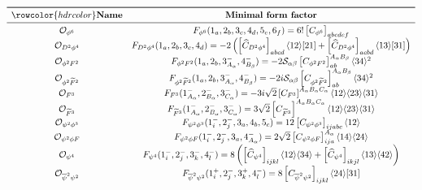 \begin{table}[tbp]
\renewcommand{\arraystretch}{2.3}
\begin{align*}
\begin{array}[t]{cc}
\toprule
\rowcolor{hdrcolor}
\text{\textbf{Name}}  & \text{\textbf{Minimal form factor}} \\
\midrule
\mathcal O_{\phi^6} & F_{\phi^6}(1_{a},2_{b},3_{c},4_{d},5_{e},6_{f}) = 6! \left[C_{\phi^6}\right]_{abcdef}\\
\mathcal O_{D^2\phi^4}  & F_{D^2\phi^4}(1_a,2_b,3_c,4_d) =-2\left(\left[\widehat C_{D^2\phi^4}\right]_{abcd} \agl{1}{2}\sqr{2}{1}  + \left[\widehat C_{D^2\phi^4}\right]_{acbd} \agl{1}{3}\sqr{3}{1}\right)\\
\mathcal{O}_{\phi^2 F^2} &
F_{\phi^2 F^2}(1_a,2_b,3^-_{A_\alpha},4^-_{B_\beta}) = -2 \mathcal S_{\alpha\beta} \left[C_{\phi^2 F^2}\right]^{A_\alpha B_\beta}_{a b}\agl{3}{4}^2\\
\mathcal{O}_{\phi^2\tildee F^2} & F_{\phi^2 \tildee F^2}(1_a,2_b,3^-_{A_\alpha},4^-_{B_\beta}) = -2i \mathcal S_{\alpha\beta} \left[C_{\phi^2 \tildee F^2}\right]^{A_\alpha B_\beta}_{a b}\agl{3}{4}^2\\
 \mathcal{O}_{F^3} & F_{F^3}(1^-_{A_\alpha},2^-_{B_\alpha},3^-_{C_\alpha}) =-3i\sqrt{2} \left[C_{F^3}\right]^{A_\alpha B_\alpha C_\alpha} \agl{1}{2}\agl{2}{3}\agl{3}{1}\\
  \mathcal{O}_{\tildee F^3} & F_{\tildee F^3}(1^-_{A_\alpha},2^-_{B_\alpha},3^-_{C_\alpha}) =3\sqrt{2} \left[C_{\tildee F^3}\right]^{A_\alpha B_\alpha C_\alpha} \agl{1}{2}\agl{2}{3}\agl{3}{1}\\
\mathcal O_{\psi^2\phi^3} & F_{\psi^2 \phi^3}(1^-_i,2^-_j,3_a,4_b,5_c) = 12 \left[ C_{\psi^2\phi^3}\right]_{ijabc} \agl{1}{2}\\
\mathcal O_{\psi^2 \phi F}   & F_{\psi^2 \phi F}(1^-_i,2^-_j,3_a,4^-_{A_\alpha}) = 2\sqrt{2} \left[C_{\psi^2 \phi F}\right]_{ija}^{A_\alpha}\agl{1}{4}\agl{2}{4}\\
\mathcal{O}_{\psi^4} &
F_{\psi^4}(1^-_i,2^-_j,3^-_k,4^-_l) = 8 \left( \left[\widehat C_{\psi^4}\right]_{ijkl}\agl{1}{2}\agl{3}{4} + \left[\widehat C_{\psi^4}\right]_{ikjl}\agl{1}{3}\agl{4}{2}\right) \\
\mathcal{O}_{\overline \psi^2 \psi^2} & F_{\overline \psi^2 \psi^2}(1^+_i,2^-_j,3^+_k,4^-_l) = 8 \left[C_{\overline \psi^2 \psi^2}\right]_{ijkl}\agl{2}{4}\sqr{3}{1}\\

\end{array}
\end{align*}
\end{table}
